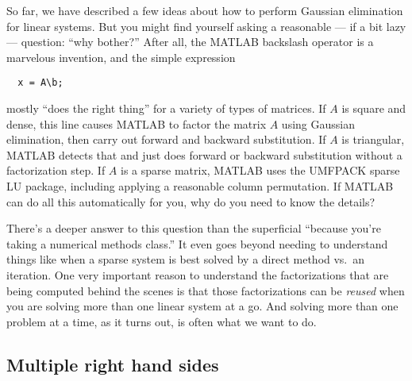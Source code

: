 \documentclass[12pt, leqno]{article}
\begin{document}
So far, we have described a few ideas about how to perform Gaussian
elimination for linear systems.  But you might find yourself asking a
reasonable --- if a bit lazy --- question: ``why bother?''  After all,
the MATLAB backslash operator is a marvelous invention, and the simple
expression
\begin{lstlisting}
  x = A\b;
\end{lstlisting}
mostly ``does the right thing'' for a variety of types of matrices.
If $A$ is square and dense, this line causes MATLAB to factor the
matrix $A$ using Gaussian elimination, then carry out forward and
backward substitution.  If $A$ is triangular, MATLAB detects that and
just does forward or backward substitution without a factorization
step.  If $A$ is a sparse matrix, MATLAB uses the UMFPACK sparse LU
package, including applying a reasonable column permutation.  If
MATLAB can do all this automatically for you, why do you need to know
the details?

There's a deeper answer to this question than the superficial
``because you're taking a numerical methods class.''  It even
goes beyond needing to understand things like when a sparse system
is best solved by a direct method vs.~an iteration.  One very
important reason to understand the factorizations that are being
computed behind the scenes is that those factorizations can be
{\em reused} when you are solving more than one linear system at a go.
And solving more than one problem at a time, as it turns out, is often
what we want to do.

\subsection{Multiple right hand sides}
\end{document}
